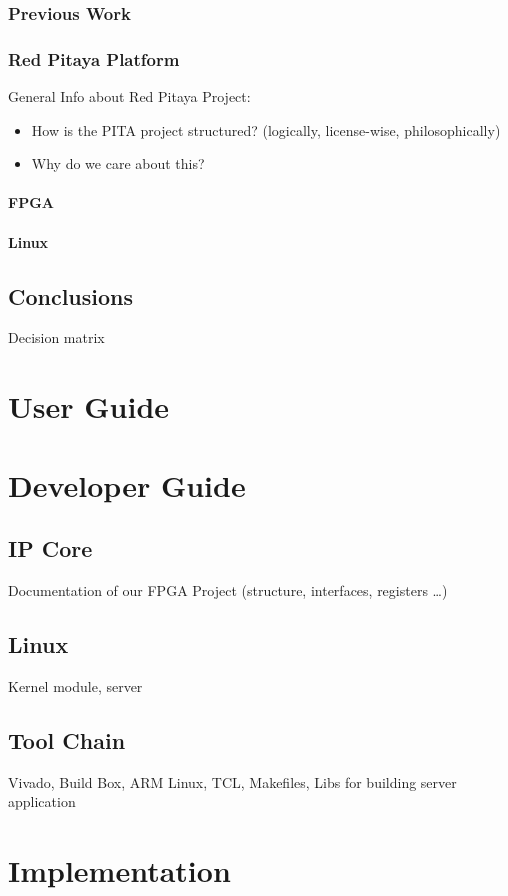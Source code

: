 \documentclass[a4paper,oneside]{alpenthesis/alpenthesis}
\begin{document}
\section{Previous Work}
\section{Red Pitaya Platform}
General Info about Red Pitaya Project:
\begin{itemize}\firmlist
    \item How is the PITA project structured? (logically, license-wise, philosophically)
    \item Why do we care about this?
\end{itemize}
\subsection{FPGA}
\subsection{Linux}

\chapter{Conclusions}
Decision matrix


\part{User Guide}

\part{Developer Guide}
\chapter{IP Core}
Documentation of our FPGA Project (structure, interfaces, registers \ldots)
\chapter{Linux}
Kernel module, server

\chapter{Tool Chain}
Vivado, Build Box, ARM Linux, TCL, Makefiles, Libs for building server application

\part{Implementation}
\end{document}
